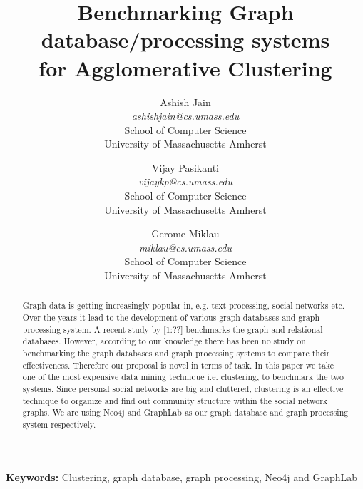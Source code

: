 \documentclass[11pt,onecolumn]{article}
\begin{document}
%
\title{Benchmarking Graph database/processing systems\\for Agglomerative Clustering}



\author{
 Ashish Jain\\
 \textit{ashishjain@cs.umass.edu}\\
School of Computer Science\\
University of Massachusetts Amherst\\
\and
 Vijay Pasikanti\\
 \textit{vijaykp@cs.umass.edu}\\
School of Computer Science\\
University of Massachusetts Amherst\\
\and
Gerome Miklau\\
\textit{miklau@cs.umass.edu}\\
School of Computer Science\\
University of Massachusetts Amherst\\
}
\maketitle

\begin{abstract}
Graph data is getting increasingly popular in, e.g. text processing, social networks etc. Over the years it lead to the development of various graph databases and graph processing system. A recent study by [1:??] benchmarks the graph and relational databases. However, according to our knowledge there has been no study on benchmarking the graph databases and graph processing systems to compare their effectiveness.  Therefore our proposal is novel in terms of task. In this paper we take one of the most expensive data mining technique i.e. clustering, to benchmark the two systems. Since personal social networks are big and cluttered, clustering is an effective technique to organize and find out community structure within the social network graphs. We are using Neo4j and GraphLab as our graph database and graph processing system respectively.
\end{abstract}


\textbf{Keywords:} Clustering, graph database, graph processing, Neo4j and GraphLab
\end{document}
